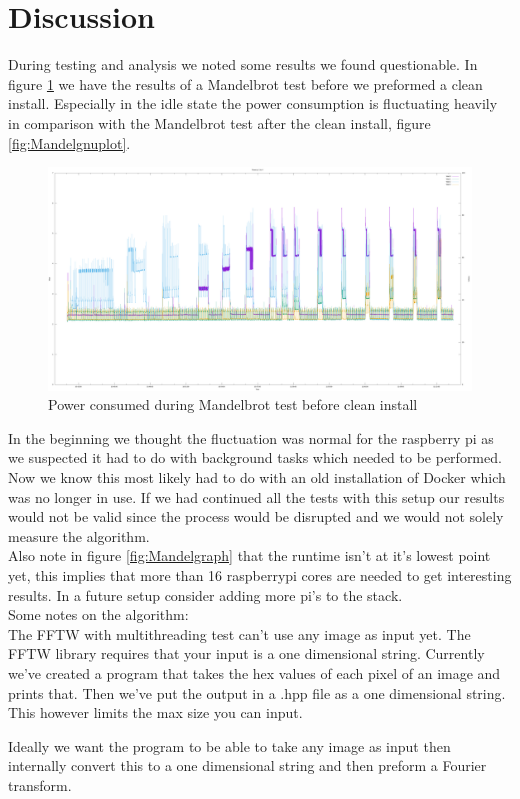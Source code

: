 \documentclass{article}
\begin{document}
\section{Discussion}
During testing and analysis we noted some results we found questionable. In figure \ref{fig:dirtymandel} we have the results of a Mandelbrot test before we preformed a clean install. Especially in the idle state the power consumption is fluctuating heavily in comparison with the Mandelbrot test after the clean install, figure \ref{fig:Mandelgnuplot}.  

\begin{figure}[H]
\centering
\includegraphics[width=12cm]{images/dirtypower.png}
\caption{Power consumed during Mandelbrot test before clean install}
\label{fig:dirtymandel}
\end{figure}

In the beginning we thought the fluctuation was normal for the raspberry pi as we suspected it had to do with background tasks which needed to be performed. Now we know this most likely had to do with an old installation of Docker which was no longer in use. 
\newline
If we had continued all the tests with this setup our results would not be valid since the process would be disrupted and we would not solely measure the algorithm.\\

Also note in figure \ref{fig:Mandelgraph} that the runtime isn't at it's lowest point yet, this implies that more than 16 raspberrypi cores are needed to get interesting results. In a future setup consider adding more pi's to the stack.\\ 

Some notes on the algorithm:\\

The FFTW with multithreading test can't use any image as input yet.
The FFTW library requires that your input is a one dimensional string. Currently we've created a program that takes the hex values of each pixel of an image and prints that. Then we've put the output in a .hpp file as a one dimensional string. This however limits the max size you can input. \par Ideally we want the program to be able to take any image as input then internally convert this to a one dimensional string and then preform a Fourier transform.\\
\end{document}
